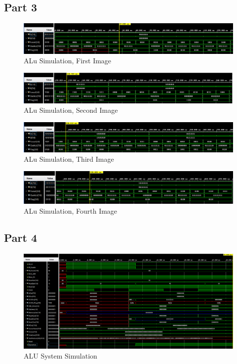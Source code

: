 \documentclass[pdftex,12pt,a4paper]{article}
\begin{document}
\subsection{Part 3}
\begin{figure}[H]
	\centering
	\includegraphics[width=1\textwidth]{results/alu_1.png}	
	\caption{ALu Simulation, First Image}
	\label{ALU Simulation 1}
\end{figure}
\begin{figure}[H]
	\centering
	\includegraphics[width=1\textwidth]{results/alu_2.png}	
	\caption{ALu Simulation, Second Image}
	\label{ALU Simulation 2}
\end{figure}
\begin{figure}[H]
	\centering
	\includegraphics[width=1\textwidth]{results/alu_3.png}	
	\caption{ALu Simulation, Third Image}
	\label{ALU Simulation 3}
\end{figure}
\begin{figure}[H]
	\centering
	\includegraphics[width=1\textwidth]{results/alu_4.png}	
	\caption{ALu Simulation, Fourth Image}
	\label{ALU Simulation 4}
\end{figure}





\subsection{Part 4}

\begin{figure}[H]
	\centering
	\includegraphics[width=1\textwidth]{results/alu_system.png}	
	\caption{ALU System Simulation}
	\label{ALU System Simulation}
\end{figure}
\end{document}
